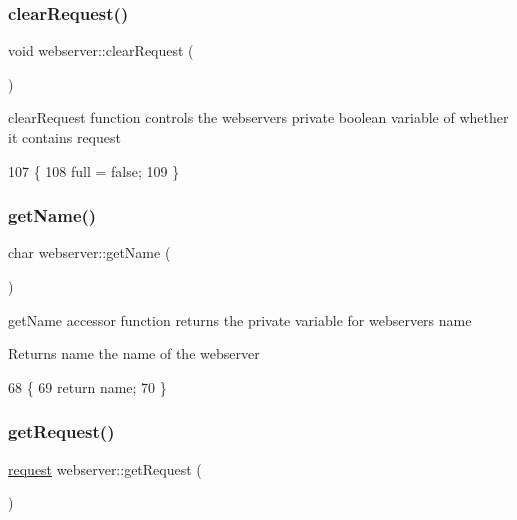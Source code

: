 \subsubsection{\texorpdfstring{clear\+Request()}{clearRequest()}}
{\footnotesize\ttfamily void webserver\+::clear\+Request (\begin{DoxyParamCaption}{ }\end{DoxyParamCaption})\hspace{0.3cm}{\ttfamily [inline]}}

clear\+Request function controls the webserver\textquotesingle{}s private boolean variable of whether it contains request 
\begin{DoxyCode}
107                             \{
108             full = \textcolor{keyword}{false};
109         \}
\end{DoxyCode}
\mbox{\label{classwebserver_ab60b4b73f23fab34800070996212c497}} 
\subsubsection{\texorpdfstring{get\+Name()}{getName()}}
{\footnotesize\ttfamily char webserver\+::get\+Name (\begin{DoxyParamCaption}{ }\end{DoxyParamCaption})\hspace{0.3cm}{\ttfamily [inline]}}

get\+Name accessor function returns the private variable for webserver\textquotesingle{}s name \begin{DoxyReturn}{Returns}
name the name of the webserver 
\end{DoxyReturn}

\begin{DoxyCode}
68                        \{
69             \textcolor{keywordflow}{return} name;
70         \}
\end{DoxyCode}
\mbox{\label{classwebserver_a8e97c299c64c0f9f46052a88888c7fc9}} 
\subsubsection{\texorpdfstring{get\+Request()}{getRequest()}}
{\footnotesize\ttfamily \hyperlink{structrequest}{request} webserver\+::get\+Request (\begin{DoxyParamCaption}{ }\end{DoxyParamCaption})\hspace{0.3cm}{\ttfamily [inline]}}

